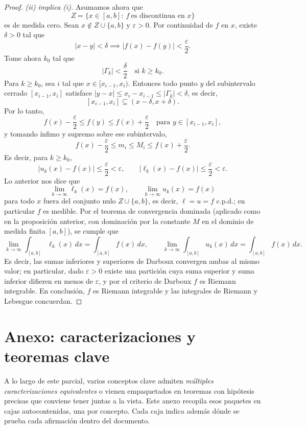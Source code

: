 \documentclass[11pt,twoside]{article}
\begin{document}
\begin{proof}
\textit{(ii) implica (i).} Asumamos ahora que
\[
Z = \{ x \in [a,b] :\ f\ \text{es discontinua en } x \}
\]
es de medida cero. Sean $x \notin Z \cup \{a, b\}$ y $\varepsilon > 0$. Por continuidad de $f$ en $x$, existe $\delta > 0$ tal que
\[
|x - y| < \delta \implies |f(x) - f(y)| < \frac{\varepsilon}{2}.
\]
Tome ahora $k_{0}$ tal que
\[
|\Gamma_{k}| < \frac{\delta}{2} \quad \text{si } k \geq k_{0}.
\]
Para $k \geq k_{0}$, sea $i$ tal que $x \in [x_{i-1}, x_{i})$. Entonces todo punto $y$ del subintervalo cerrado $[x_{i-1}, x_{i}]$ satisface $|y - x| \leq x_{i} - x_{i-1} \leq |\Gamma_{k}| < \delta$, es decir,
\[
[x_{i-1}, x_{i}] \subseteq (x - \delta, x + \delta).
\]
Por lo tanto,
\[
f(x) - \frac{\varepsilon}{2} \leq f(y) \leq f(x) + \frac{\varepsilon}{2} \quad \text{para } y \in [x_{i-1}, x_{i}],
\]
y tomando ínfimo y supremo sobre ese subintervalo,
\[
f(x) - \frac{\varepsilon}{2} \leq m_{i} \leq M_{i} \leq f(x) + \frac{\varepsilon}{2}.
\]
Es decir, para $k \geq k_{0}$,
\[
|u_{k}(x) - f(x)| \leq \frac{\varepsilon}{2} < \varepsilon, \qquad |\ell_{k}(x) - f(x)| \leq \frac{\varepsilon}{2} < \varepsilon.
\]
Lo anterior nos dice que
\[
\lim_{k \to \infty} \ell_{k}(x) = f(x), \qquad \lim_{k \to \infty} u_{k}(x) = f(x)
\]
para todo $x$ fuera del conjunto nulo $Z \cup \{a,b\}$, es decir, $\ell = u = f$ c.p.d.; en particular $f$ es medible. Por el teorema de convergencia dominada (aplicado como en la proposición anterior, con dominación por la constante $M$ en el dominio de medida finita $[a,b]$), se cumple que
\[
\lim_{k \to \infty} \int_{[a,b]} \ell_{k}(x) \, dx = \int_{[a,b]} f(x) \, dx, \qquad \lim_{k \to \infty} \int_{[a,b]} u_{k}(x) \, dx = \int_{[a,b]} f(x) \, dx.
\]
Es decir, las sumas inferiores y superiores de Darboux convergen ambas al mismo valor; en particular, dado $\varepsilon > 0$ existe una partición cuya suma superior y suma inferior difieren en menos de $\varepsilon$, y por el criterio de Darboux $f$ es Riemann integrable. En conclusión, $f$ es Riemann integrable y las integrales de Riemann y Lebesgue concuerdan.
\end{proof}

\appendix
\section{Anexo: caracterizaciones y teoremas clave}

A lo largo de este parcial, varios conceptos clave admiten \emph{múltiples caracterizaciones equivalentes} o vienen empaquetados en teoremas con hipótesis precisas que conviene tener juntas a la vista. Este anexo recopila esos paquetes en cajas autocontenidas, una por concepto. Cada caja indica además dónde se prueba cada afirmación dentro del documento.
\end{document}

